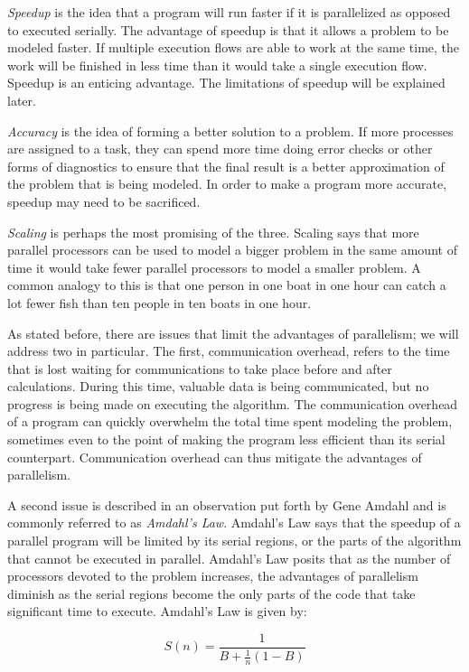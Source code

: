 \documentclass[a4paper, 11pt]{article}
\begin{document}
\emph{Speedup} is the idea that a program will run faster if it is parallelized as opposed to executed serially. The advantage of speedup is that it allows a problem to be modeled faster. If multiple execution flows are able to work at the same time, the work will be finished in less time than it would take a single execution flow. Speedup is an enticing advantage. The limitations of speedup will be explained later.

\emph{Accuracy} is the idea of forming a better solution to a problem. If more processes are assigned to a task, they can spend more time doing error checks or other forms of diagnostics to ensure that the final result is a better approximation of the problem that is being modeled. In order to make a program more accurate, speedup may need to be sacrificed.

\emph{Scaling} is perhaps the most promising of the three. Scaling says that more parallel processors can be used to model a bigger problem in the same amount of time it would take fewer parallel processors to model a smaller problem. A common analogy to this is that one person in one boat in one hour can catch a lot fewer fish than ten people in ten boats in one hour.

As stated before, there are issues that limit the advantages of parallelism; we will address two in particular. The first, communication overhead, refers to the time that is lost waiting for communications to take place before and after calculations. During this time, valuable data is being communicated, but no progress is being made on executing the algorithm. The communication overhead of a program can quickly overwhelm the total time spent modeling the problem, sometimes even to the point of making the program less efficient than its serial counterpart. Communication overhead can thus mitigate the advantages of parallelism.

A second issue is described in an observation put forth by Gene Amdahl and is commonly referred to as \emph{Amdahl's Law}. Amdahl's Law says that the speedup of a parallel program will be limited by its serial regions, or the parts of the algorithm that cannot be executed in parallel. Amdahl's Law posits that as the number of processors devoted to the problem increases, the advantages of parallelism diminish as the serial regions become the only parts of the code that take significant time to execute. Amdahl's Law is given by:

\begin{equation}
\label{amdahl}
	S(n) = \frac{1}{B + \frac{1}{n}(1 - B)}
\end{equation}
\end{document}
